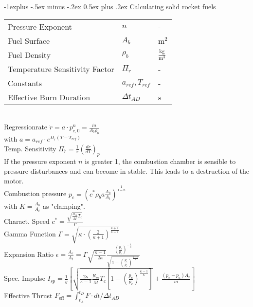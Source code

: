 \documentclass[10pt,landscape]{article}
\makeatletter
\renewcommand{\subsection}{\@startsection{subsection}{2}{0mm}%
                                {-1explus -.5ex minus -.2ex}%
                                {0.5ex plus .2ex}%
                                {\normalfont\normalsize\bfseries}}
\makeatother
\begin{document}
\begin{multicols}{3}
\subsection{Calculating solid rocket fuels}
\begin{tabular}{lll}
	Pressure Exponent & $n$ & - \\
	Fuel Surface & $A_b$ & $\text{m}^2$ \\
	Fuel Density & $\rho_b$ & $\frac{\text{kg}}{\text{m}^3}$ \\
	Temperature Sensitivity Factor & $\Pi_{\dot{r}}$ & - \\
	Constants & $a_{ref}, T_{ref}$ & - \\
	Effective Burn Duration & $\Delta t_{AD}$ & s \\
\end{tabular}\\
\vspace{7pt}
Regressionrate $\dot{r}=a\cdot p_{c,0}^n = \frac{\dot{m}}{A_b\rho_b}$\\
with $a = a_{ref}\cdot e^{\Pi_{\dot{r}} (T-T_{ref})}$\\
Temp. Sensitivity $\Pi_{\dot{r}} = \frac{1}{\dot{r}} (\frac{d \dot{r}}{d T})_p$ \\
\vspace{5pt}
If the pressure exponent $n$ is greater 1, the combustion chamber is sensible to pressure disturbances and can become in-stable. This leads to a destruction of the motor.\\
\vspace{12pt}
Combustion pressure $p_c = (c^* \rho_b a \frac{A_b}{A_t})^\frac{1}{1-n}$\\
with $ K = \frac{A_b}{A_t}$ as "clamping".\\
\vspace{7pt}
Charact. Speed $c^* = \frac{\sqrt{\frac{R_m}{\bar{M}}T_c}}{\Gamma}$\\
Gamma Function $\Gamma = \sqrt{\kappa \cdot (\frac{2}{\kappa+1})^{\frac{\kappa+1}{\kappa-1}}}$\\
\vspace{7pt}
Expansion Ratio $\epsilon = \frac{A_e}{A_t} = \Gamma \sqrt{\frac{\kappa-1}{2 \kappa}} \frac{(\frac{p_e}{p_c})^{-\frac{1}{\kappa}}}{\sqrt{1-(\frac{p_e}{p_c})^\frac{\kappa-1}{\kappa}}}$\\
\vspace{7pt}
Spec. Impulse $I_{sp} = \frac{1}{g} \left[ \sqrt{\frac{2\kappa}{\kappa-1}\frac{R_m}{\bar{M}} T_c \left[1-(\frac{p_e}{p_c})^\frac{\kappa-1}{\kappa}\right]} + \frac{(p_e-p_a) A_e}{\dot{m}}\right]$\\
\vspace{12pt}
Effective Thrust $F_{\text{eff}}=\int_{t_A}^{t_D}F\cdot dt / \Delta t_{AD}$\\
\vspace{5pt}


\end{multicols}
\end{document}
